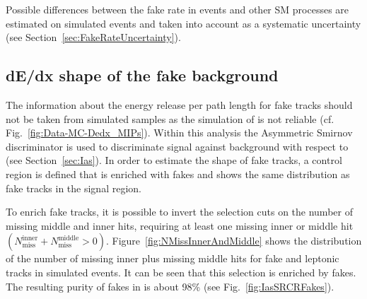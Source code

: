 Possible differences between the fake rate in \Zlep events and other SM processes are estimated on simulated events and taken into account as a systematic uncertainty (see Section~\ref{sec:FakeRateUncertainty}).

\subsection{dE/dx shape of the fake background}
The information about the energy release per path length for fake tracks should not be taken from simulated samples as the simulation of \dedx is not reliable (cf. Fig.~\ref{fig:Data-MC-Dedx_MIPs}).
Within this analysis the Asymmetric Smirnov discriminator \ias is used to discriminate signal against background with respect to \dedx (see Section~\ref{sec:Ias}). 
In order to estimate the \ias shape of fake tracks, a control region \fakeCR is defined that is enriched with fakes and shows the same \ias distribution as fake tracks in the signal region.

To enrich fake tracks, it is possible to invert the selection cuts on the number of missing middle and inner hits, \ie requiring at least one missing inner or middle hit $\left( N_{\text{miss}}^{\text{inner}} +N_{\text{miss}}^{\text{middle}}>0\right)$.
Figure~\ref{fig:NMissInnerAndMiddle} shows the distribution of the number of missing inner plus missing middle hits for fake and leptonic tracks in simulated \WJets events.
It can be seen that this selection is enriched by fakes.
The resulting purity of fakes in \fakeCR is about 98\% (see Fig.~\ref{fig:IasSRCRFakes}). 

